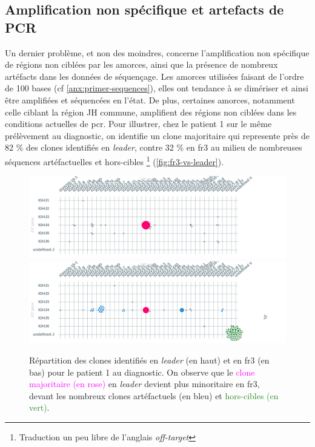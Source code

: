 \subsection{Amplification non spécifique et artefacts de PCR}

Un dernier problème, et non des moindres, concerne l'amplification non
spécifique de régions non ciblées par les amorces, ainsi que la présence de
nombreux artéfacts dans les données de séquençage. Les amorces utilisées
faisant de l'ordre de 100 bases (cf \autoref{anx:primer-sequences}), elles ont
tendance à se dimériser et ainsi être amplifiées et séquencées en l'état. De
plus, certaines amorces, notamment celle ciblant la région JH commune,
amplifient des régions non ciblées dans les conditions actuelles de \gls{pcr}.
Pour illustrer, chez le patient 1 sur le même prélèvement au diagnostic, on identifie 
un clone majoritaire qui represente près de 82 \% des clones identifiés en \textit{leader}, 
contre 32 \% en \gls{fr}3 au milieu de nombreuses séquences artéfactuelles et hors-cibles 
\footnote{Traduction un peu libre de l'anglais \textit{off-target}} (\autoref{fig:fr3-vs-leader}).

\begin{figure}[H]
    \centering
    \includegraphics[width=1\textwidth]{images/diag_leader.png}
    \vspace{0.5cm}
    \includegraphics[width=1\textwidth]{images/diag_fr3.png}
    \caption{
        Répartition des clones identifiés en \textit{leader} (en haut) et en \gls{fr}3 (en bas)
        pour le patient 1 au diagnostic. On observe que le \textcolor{Magenta}{clone majoritaire (en rose)}
        en \textit{leader} devient plus minoritaire en \gls{fr}3, devant les \textcolor{ProcessBlue}{nombreux clones artéfactuels (en bleu)}
        et \textcolor{ForestGreen}{hors-cibles (en vert)}.
    }
    \label{fig:fr3-vs-leader}
\end{figure}

